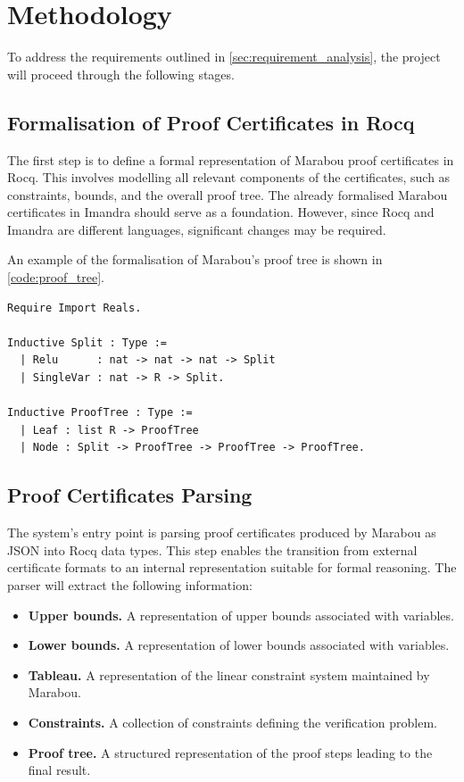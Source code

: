 \section{Methodology}

To address the requirements outlined in \autoref{sec:requirement_analysis}, the project will proceed through the following stages.

\subsection{Formalisation of Proof Certificates in Rocq}

The first step is to define a formal representation of Marabou proof certificates in Rocq. This involves modelling all relevant components of the certificates, such as constraints, bounds, and the overall proof tree. The already formalised Marabou certificates in Imandra should serve as a foundation. However, since Rocq and Imandra are different languages, significant changes may be required.

An example of the formalisation of Marabou's proof tree is shown in \autoref{code:proof_tree}.

\begin{lstlisting}[language=Coq, caption={Marabou proof tree as an inductive data type in Rocq}, label={code:proof_tree}]
Require Import Reals.

Inductive Split : Type :=
  | Relu      : nat -> nat -> nat -> Split
  | SingleVar : nat -> R -> Split.

Inductive ProofTree : Type :=
  | Leaf : list R -> ProofTree
  | Node : Split -> ProofTree -> ProofTree -> ProofTree.
\end{lstlisting}


\subsection{Proof Certificates Parsing}

The system's entry point is parsing proof certificates produced by Marabou as JSON into Rocq data types. This step enables the transition from external certificate formats to an internal representation suitable for formal reasoning.
The parser will extract the following information:
\begin{itemize}
    \item \textbf{Upper bounds.} A representation of upper bounds associated with variables.
    \item \textbf{Lower bounds.} A representation of lower bounds associated with variables.
    \item \textbf{Tableau.} A representation of the linear constraint system maintained by Marabou.
    \item \textbf{Constraints.} A collection of constraints defining the verification problem.
    \item \textbf{Proof tree.} A structured representation of the proof steps leading to the final result.
\end{itemize}

